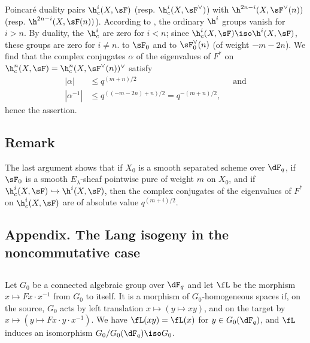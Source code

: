 Poincaré duality pairs $\h_c^i(X,\sF)$ (resp. 
$\h_c^i(X,\sF^\vee)$) with $\h^{2n-i}(X,\sF^\vee(n))$ (resp. 
$\h^{2n-i}(X,\sF(n))$). According to , the ordinary $\h^i$ groups 
vanish for $i>n$. By duality, the $\h_c^i$ are zero for $i<n$; since 
$\h_c^i(X,\sF) \iso \h^i(X,\sF)$, these groups are zero for $i\ne n$. 
 to $\sF_0$ and to $\sF_0^\vee(n)$ (of weight 
$-m-2n$). We find that the complex conjugates $\alpha$ of the eigenvalues 
of $F^\ast$ on $\h_c^n(X,\sF) = \h_c^n(X,\sF^\vee(n))^\vee$ satisfy 
\begin{align*}
  |\alpha| &\leqslant q^{(m+n)/2} && \text{and} \\
  |\alpha^{-1}| &\leqslant q^{((-m-2n)+n)/2} = q^{-(m+n)/2} \text{,}
\end{align*}
hence the assertion. 





\subsection{Remark}\label{VI:1-21}

The last argument shows that if $X_0$ is a smooth separated scheme over 
$\dF_q$, if $\sF_0$ is a smooth $E_\lambda$-sheaf pointwise pure of weight 
$m$ on $X_0$, and if $\h_c^i(X,\sF) \hookrightarrow \h^i(X,\sF)$, then the 
complex conjugates of the eigenvalues of $F^\ast$ on $\h_c^i(X,\sF)$ are 
of absolute value $q^{(m+i)/2}$. 






\subsection*{Appendix. The Lang isogeny in the noncommutative case}




\subsection{}\label{VI:1-22}

Let $G_0$ be a connected algebraic group over $\dF_q$ and let $\fL$ be the morphism 
$x\mapsto F x\cdot x^{-1}$ from $G_0$ to itself. It is a morphism of 
$G_0$-homogeneous spaces if, on the source, $G_0$ acts by left translation 
$x\mapsto (y\mapsto x y)$, and on the target by 
$x\mapsto (y\mapsto F x\cdot y\cdot x^{-1})$. We have $\fL(xy) = \fL(x)$ for 
$y\in G_0(\dF_q)$, and $\fL$ induces an isomorphism $G_0/G_0(\dF_q)\iso G_0$. 


